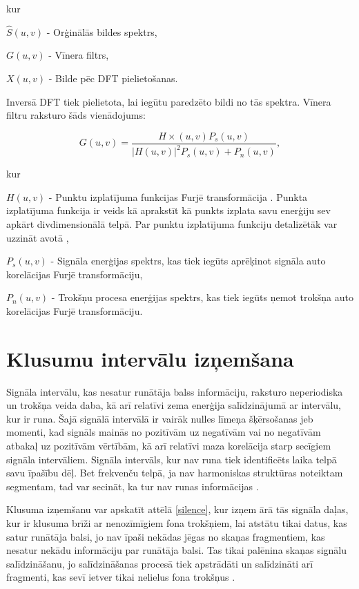 \documentclass[12pt,paper=A4]{report}
\begin{document}
kur 

$\hat{S}(u,v)$ - Orģinālās bildes spektrs,

$G(u,v)$ - Vīnera filtrs,

$X(u,v)$ - Bilde pēc DFT pielietošanas.

Inversā DFT tiek pielietota, lai iegūtu paredzēto bildi no tās spektra. Vīnera filtru raksturo šāds vienādojums:

\begin{equation}
G(u,v) = \frac{H\times(u,v)P_s(u,v)}{|H(u,v)|^2P_s(u,v)+P_n(u,v)},
\end{equation}

kur

$H(u,v)$ - Punktu izplatījuma funkcijas Furjē transformācija \cite{pftdft}. Punkta izplatījuma funkcija ir veids kā aprakstīt kā punkts izplata savu enerģiju sev apkārt divdimensionālā telpā. Par punktu izplatījuma funkciju detalizētāk var uzzināt avotā \cite{points},

$P_s(u,v)$ - Signāla enerģijas spektrs, kas tiek iegūts aprēķinot signāla auto korelācijas Furjē transformāciju, 

$P_n(u,v)$ - Trokšņu procesa enerģijas spektrs, kas tiek iegūts ņemot trokšņa auto korelācijas Furjē transformāciju.




\section{Klusumu intervālu izņemšana}
Signāla intervālu, kas nesatur runātāja balss informāciju, raksturo neperiodiska un trokšņa veida daba, kā arī relatīvi zema enerģija salīdzinājumā ar intervālu, kur ir runa. Šajā signālā intervālā ir vairāk nulles līmeņa šķērsošanas jeb momenti, kad signāls mainās no pozitīvām uz negatīvām vai no negatīvām atbakaļ uz pozitīvām vērtībām, kā arī relatīvi maza korelācija starp secīgiem signāla intervāliem. Signāla intervāls, kur nav runa tiek identificēts laika telpā savu īpašību dēļ. Bet frekvenču telpā, ja nav harmoniskas struktūras noteiktam segmentam, tad var secināt, ka tur nav runas informācijas \cite{http://iitg.vlab.co.in/?sub=59&brch=164&sim=613&cnt=2}.

Klusuma izņemšanu var apskatīt attēlā \ref{silence}, kur izņem ārā tās signāla daļas, kur ir klusuma brīži ar nenozīmīgiem fona trokšņiem, lai atstātu tikai datus, kas satur runātāja balsi, jo nav īpaši nekādas jēgas no skaņas  fragmentiem, kas nesatur nekādu informāciju par runātāja balsi. Tas tikai palēnina skaņas signālu salīdzināšanu, jo salīdzināšanas procesā tiek apstrādāti un salīdzināti arī fragmenti, kas sevī ietver tikai nelielus fona trokšņus \cite{http://www.asha.org/policy/GL1988-00008.htm}.
\end{document}
